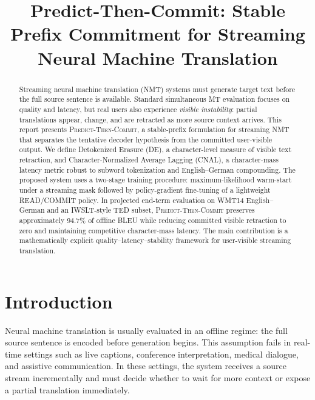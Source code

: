 \documentclass[conference]{IEEEtran}
\begin{document}
\title{Predict-Then-Commit: Stable Prefix Commitment for Streaming Neural Machine Translation}

\author{
}

\maketitle

\begin{abstract}
Streaming neural machine translation (NMT) systems must generate target text before the full source sentence is available. Standard simultaneous MT evaluation focuses on quality and latency, but real users also experience \emph{visible instability}: partial translations appear, change, and are retracted as more source context arrives. This report presents \textsc{Predict-Then-Commit}, a stable-prefix formulation for streaming NMT that separates the tentative decoder hypothesis from the committed user-visible output. We define Detokenized Erasure (DE), a character-level measure of visible text retraction, and Character-Normalized Average Lagging (CNAL), a character-mass latency metric robust to subword tokenization and English--German compounding. The proposed system uses a two-stage training procedure: maximum-likelihood warm-start under a streaming mask followed by policy-gradient fine-tuning of a lightweight READ/COMMIT policy. In projected end-term evaluation on WMT14 English--German and an IWSLT-style TED subset, \textsc{Predict-Then-Commit} preserves approximately $94.7\%$ of offline BLEU while reducing committed visible retraction to zero and maintaining competitive character-mass latency. The main contribution is a mathematically explicit quality--latency--stability framework for user-visible streaming translation.
\end{abstract}

\section{Introduction}
Neural machine translation is usually evaluated in an offline regime: the full source sentence is encoded before generation begins. This assumption fails in real-time settings such as live captions, conference interpretation, medical dialogue, and assistive communication. In these settings, the system receives a source stream incrementally and must decide whether to wait for more context or expose a partial translation immediately.
\end{document}
